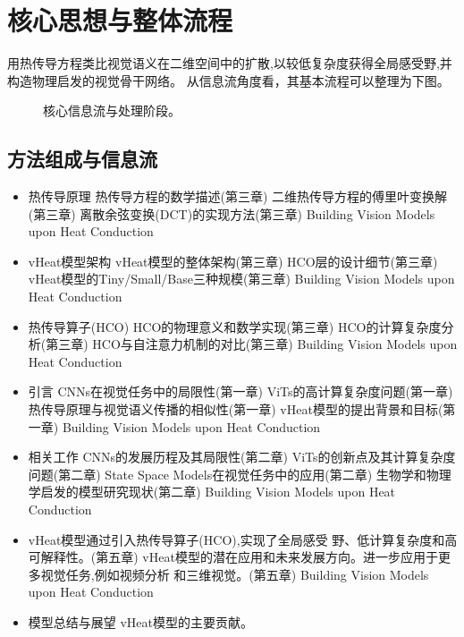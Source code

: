 \documentclass[UTF8,11pt,a4paper]{ctexart}
\begin{document}
\section{核心思想与整体流程}
用热传导方程类比视觉语义在二维空间中的扩散,以较低复杂度获得全局感受野,并构造物理启发的视觉骨干网络。 从信息流角度看，其基本流程可以整理为下图。

\begin{figure}[H]
\centering
{}
\caption{核心信息流与处理阶段。}
\end{figure}

\subsection{方法组成与信息流}
\begin{itemize}
\item 热传导原理 热传导方程的数学描述(第三章) 二维热传导方程的傅里叶变换解(第三章) 离散余弦变换(DCT)的实现方法(第三章) Building Vision Models upon Heat Conduction
\item vHeat模型架构 vHeat模型的整体架构(第三章) HCO层的设计细节(第三章) vHeat模型的Tiny/Small/Base三种规模(第三章) Building Vision Models upon Heat Conduction
\item 热传导算子(HCO) HCO的物理意义和数学实现(第三章) HCO的计算复杂度分析(第三章) HCO与自注意力机制的对比(第三章) Building Vision Models upon Heat Conduction
\item 引言 CNNs在视觉任务中的局限性(第一章) ViTs的高计算复杂度问题(第一章) 热传导原理与视觉语义传播的相似性(第一章) vHeat模型的提出背景和目标(第一章) Building Vision Models upon Heat Conduction
\item 相关工作 CNNs的发展历程及其局限性(第二章) ViTs的创新点及其计算复杂度问题(第二章) State Space Models在视觉任务中的应用(第二章) 生物学和物理学启发的模型研究现状(第二章) Building Vision Models upon Heat Conduction
\item vHeat模型通过引入热传导算子(HCO),实现了全局感受 野、低计算复杂度和高可解释性。(第五章) vHeat模型的潜在应用和未来发展方向。进一步应用于更多视觉任务,例如视频分析 和三维视觉。(第五章) Building Vision Models upon Heat Conduction
\item 模型总结与展望 vHeat模型的主要贡献。
\end{itemize}
\end{document}
